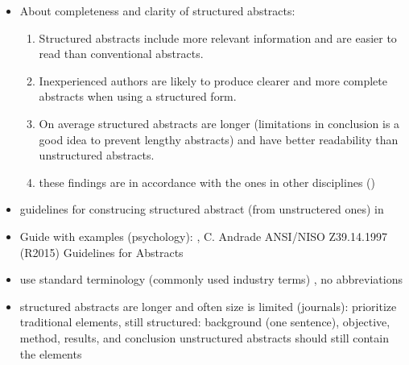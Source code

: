 \begin{itemize}
\item About completeness and clarity of structured abstracts:
	\begin{enumerate}
	\item Structured abstracts include more relevant information and are easier to read than conventional abstracts. \cite{Budgen2008} \cite{Budgen2007}
	\item Inexperienced authors are likely to produce clearer and more complete abstracts when using a structured form.\cite{Budgen2011} 
	\item On average structured abstracts are longer (limitations in conclusion is a good idea to prevent lengthy abstracts) and have better readability than unstructured abstracts. \cite{KBO2008}
	\item these findings are in accordance with the ones in other disciplines ()
	\end{enumerate}
\item guidelines for construcing structured abstract (from unstructered ones) in \cite{KBO2008}
\item Guide with examples (psychology): , C. Andrade
	\newline
	ANSI/NISO Z39.14.1997 (R2015) Guidelines for Abstracts
\item use standard terminology (commonly used industry terms) \cite{Jedlitschka2008}, no abbreviations \cite{KBO2008}
\item structured abstracts are longer and often size is limited (journals): prioritize traditional elements, still structured: background (one sentence), objective, method, results, and conclusion \cite{Jedlitschka2008}
\newline
unstructured abstracts should still contain the elements
\end{itemize}